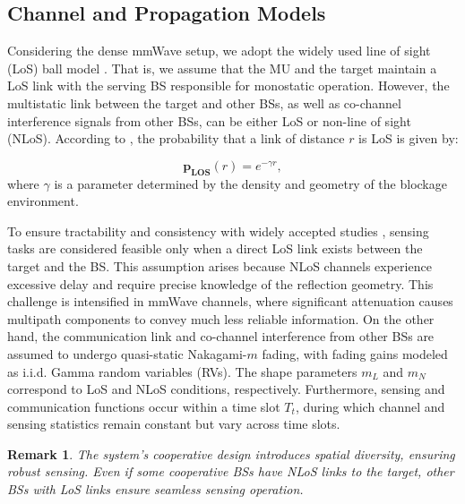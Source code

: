 \documentclass[journal]{IEEEtran}
\newtheorem{remark}{\textbf{Remark}}
\begin{document}
  

\subsection{ Channel and Propagation Models}



Considering the dense mmWave setup, we adopt the widely used line of sight (LoS) ball model \cite{yu2017coverage}. That is, we assume that the MU and the target maintain a LoS link with the serving BS responsible for monostatic operation.  However, the multistatic link between the target and other BSs, as well as co-channel interference signals from other BSs, can be either LoS or non-line of sight (NLoS). According to \cite{akdeniz2014millimeter,rebato2019stochastic}, the probability that a link of distance \( r \) is LoS is given by:

\begin{equation}\label{los_prop}
\boldsymbol{p}_{\boldsymbol{LOS}}(r) = e^{-\gamma r},
\end{equation}
where \(\gamma\) is a parameter determined by the density and geometry of the blockage environment.

To ensure tractability and consistency with widely accepted studies \cite{olson2023coverage,behdad2024multi,yang2024coordinated,salem2024rethinking,dehkordi2024multistatic,10769538}, sensing tasks are considered feasible only when a direct LoS link exists between the target and the BS. This assumption arises because NLoS channels experience excessive delay and require precise knowledge of the reflection geometry. This challenge is intensified in mmWave channels, where significant attenuation causes multipath components to convey much less reliable information.
On the other hand, the communication link and co-channel interference from other BSs are assumed to undergo quasi-static Nakagami-$m$ fading, with fading gains modeled as i.i.d. Gamma random variables (RVs). The shape parameters $m_L$ and $m_N$ correspond to LoS and NLoS conditions, respectively. Furthermore, sensing and communication functions occur within a time slot $T_t$, during which channel and sensing statistics remain constant but vary across time slots.




\begin{remark}
The system's cooperative design introduces spatial diversity, ensuring robust sensing. Even if some cooperative BSs have NLoS links to the target, other BSs with LoS links ensure seamless sensing operation.
\end{remark}
\end{document}
